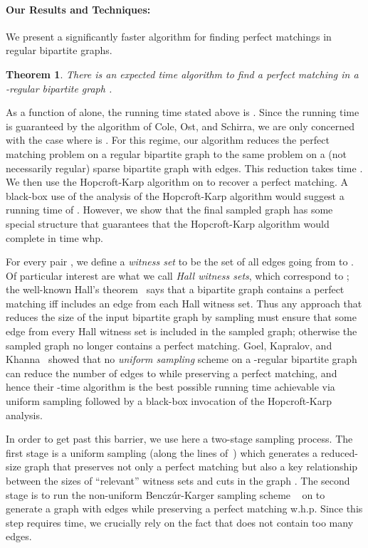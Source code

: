 \documentclass[11pt]{article}
\newtheorem{theorem}{Theorem}[section]
\begin{document}
\paragraph{Our Results and Techniques:}
We present a significantly faster algorithm for finding perfect matchings in
regular bipartite graphs.
\begin{theorem}
There is an  expected time
algorithm to find a perfect matching in a -regular bipartite graph .
\end{theorem}
As a function of  alone, the running time stated above is . Since the  running time is guaranteed by the algorithm of
Cole, Ost, and Schirra, we are only concerned with the case where  is
. For this regime, our algorithm reduces the perfect
matching problem on a regular bipartite graph  to the same problem on a
(not necessarily regular) sparse bipartite graph  with 
edges. This reduction takes time . We then use the
Hopcroft-Karp algorithm on  to recover a perfect matching. A black-box use
of the analysis of the Hopcroft-Karp algorithm would suggest a running time of
. However, we show that the final
sampled graph has some special structure that guarantees that the
Hopcroft-Karp algorithm would complete in time  whp.

For every pair , we define a {\em witness set}
 to be the set of all edges going from  to . Of
particular interest are what we call {\em Hall witness sets}, which correspond
to ; the well-known Hall's theorem~\cite{b:graphtheory} says that a
bipartite graph  contains a perfect matching iff  includes an
edge from each Hall witness set.
Thus any approach that reduces the size of the input bipartite graph by
sampling must ensure that some edge from every Hall witness set is included in
the sampled graph; otherwise the sampled graph no longer contains a perfect
matching.  Goel, Kapralov, and Khanna~\cite{gkk:rbp08} showed that no {\em
  uniform sampling} scheme on a -regular bipartite graph can reduce the
number of edges to  while preserving a perfect
matching, and hence their -time algorithm is the best
possible running time achievable via uniform sampling followed by a black-box
invocation of the Hopcroft-Karp analysis.

In order to get past this barrier, we use here a two-stage sampling
process. The first stage is a uniform sampling (along the lines
of~\cite{gkk:rbp08}) which generates a reduced-size graph  that
preserves not only a perfect matching but also a key relationship between the
sizes of ``relevant'' witness sets and cuts in the graph . The second stage
is to run the non-uniform Bencz\'{u}r-Karger sampling scheme
~\cite{benczurkarger96} on  to generate a graph  with 
edges while preserving a perfect matching w.h.p. Since this step requires
 time, we crucially rely on the fact that  does not
contain too many edges.
\end{document}
